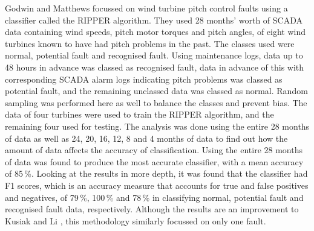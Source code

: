 Godwin and Matthews \cite{Godwi13} focussed on wind turbine pitch control
faults using a classifier called the RIPPER algorithm. They used 28 months'
worth of SCADA data containing wind speeds, pitch motor torques and pitch
angles, of eight wind turbines known to have had pitch problems in the past.
The classes used were normal, potential fault and recognised fault. Using
maintenance logs, data up to 48 hours in advance was classed as recognised
fault, data in advance of this with corresponding SCADA alarm logs indicating
pitch problems was classed as potential fault, and the remaining unclassed
data was classed as normal. Random sampling was performed here as well to
balance the classes and prevent bias. The data of four turbines were used to
train the RIPPER algorithm, and the remaining four used for testing. The
analysis was done using the entire 28 months of data as well as 24, 20, 16,
12, 8 and 4 months of data to find out how the amount of data affects the
accuracy of classification. Using the entire 28 months of data was found to
produce the most accurate classifier, with a mean accuracy of 85\,\%. Looking
at the results in more depth, it was found that the classifier had F1 scores,
which is an accuracy measure that accounts for true and false positives and
negatives, of 79\,\%, 100\,\% and 78\,\% in classifying normal, potential
fault and recognised fault data, respectively. Although the results are an
improvement to Kusiak and Li \cite{Kusia11}, this methodology similarly
focussed on only one fault.

